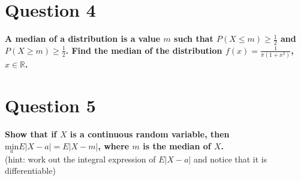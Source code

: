 \documentclass{article}
\newcommand{\R}{\mathbb{R}}
\begin{document}

\section*{Question 4}
\textbf{A median of a distribution is a value $m$ such that $P(X\leq m)\geq\frac{1}{2}$ and $P(X\geq m)\geq\frac{1}{2}$. Find the median of the distribution $f(x)=\frac{1}{\pi(1+x^2)}$, $x\in\R$.}
\bigskip \\




\section*{Question 5}
\textbf{Show that if $X$ is a continuous random variable, then $\underset{a}{\text{min}}E|X-a|=E|X-m|$, where $m$ is the median of $X$.}
\bigskip \\
(hint: work out the integral expression of $E|X-a|$ and notice that it is differentiable)


\end{document}
